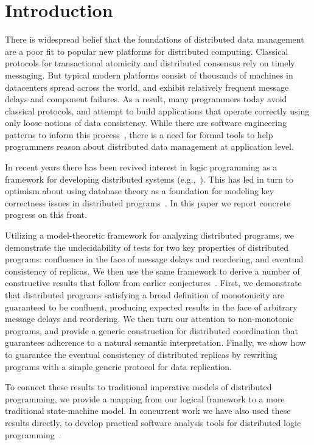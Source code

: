 \section{Introduction}
There is widespread belief that the foundations of distributed data management are a poor fit to popular new platforms for distributed computing. Classical protocols for transactional atomicity and distributed consensus rely on timely messaging. But typical modern platforms consist of thousands of machines in datacenters spread across the world, and exhibit relatively frequent message delays and component failures.  As a result, many programmers today avoid classical protocols, and attempt to build applications that operate correctly using only loose notions of data consistency.  While there are software engineering patterns to inform this process~\cite{}, there is a need for formal tools to help programmers reason about distributed data management at application level.

In recent years there has been revived interest in logic programming as a framework for developing distributed systems (e.g.,~\cite{reactors,boom}).  This has led in turn to optimism about using database theory as a foundation for modeling key correctness issues in distributed programs~\cite{podskey-sigrec}.
In this paper we report concrete progress on this front.  

Utilizing a model-theoretic framework for analyzing distributed programs, we demonstrate the undecidability of tests for two key properties of distributed programs: confluence in the face of message delays and reordering, and eventual consistency of replicas.  We then use the same framework to derive a number of constructive results that follow from earlier conjectures~\cite{podskey-sigrec}.
First, we demonstrate that distributed programs satisfying a broad definition of  monotonicity are guaranteed to be confluent, producing expected results in the face of arbitrary message delays and reordering.  We then turn our attention to non-monotonic programs, and provide a generic construction for distributed coordination that guarantees adherence to a natural semantic interpretation.  Finally, we show how to guarantee the eventual consistency of distributed replicas by rewriting programs with a simple generic protocol for data replication.

To connect these results to traditional imperative models of distributed programming, we provide a mapping from our logical framework to a more traditional state-machine model.  In concurrent work we have also used these results directly, to develop practical software analysis tools for distributed logic programming~\cite{cidr11}.  

